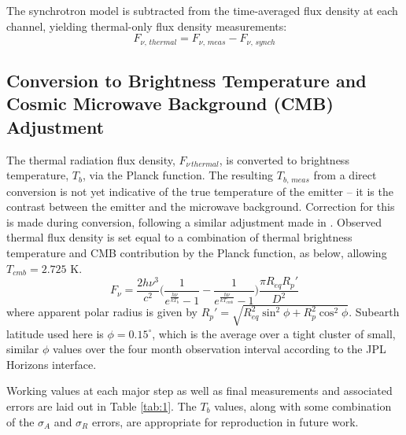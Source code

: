 \documentclass{article}
\newcommand{\expon}[1]{e^{#1}}
\begin{document}
	The synchrotron model is subtracted from the time-averaged flux density at each channel, yielding thermal-only flux density measurements:
	$$F_{\nu,\,thermal} = F_{\nu,\,meas} - F_{\nu,\,synch}$$


\subsection{Conversion to Brightness Temperature and Cosmic Microwave Background (CMB) Adjustment} %
	
	The thermal radiation flux density, $F_{\nu\,thermal}$, is converted to brightness temperature, $T_b$, via the Planck function.
	The resulting $T_{b,\,meas}$ from a direct conversion is not yet indicative of the true temperature of the emitter -- it is the contrast between the emitter and the microwave background.
	Correction for this is made during conversion, following a similar adjustment made in \citealt{2014Icar..237..211D}.
	Observed thermal flux density is set equal to a combination of thermal brightness temperature and CMB contribution by the Planck function, as below, allowing $T_{cmb} = 2.725$ K.
	$$ F_{\nu} = \frac{2h\nu^3}{c^2}\Bigg( \frac{1}{\expon{\frac{h\nu}{kT_b}} - 1} - \frac{1}{\expon{\frac{h\nu}{kT_{cmb}}} - 1} \Bigg)
		\frac{\pi R_{eq} R_{p}'}{D^2} $$
	where apparent polar radius is given by $R_{p}' = \sqrt{R_{eq}^{2}\sin^{2}{\phi} + R_{p}^{2}\cos^{2}{\phi}}$.
	Subearth latitude used here is $\phi = 0.15^{\circ}$, which is the average over a tight cluster of
	small, similar $\phi$ values over the four month observation interval according to the JPL Horizons interface.

	Working values at each major step as well as final measurements and associated errors are laid out in Table \ref{tab:1}.
	The $T_b$ values, along with some combination of the $\sigma_{A}$ and $\sigma_{R}$ errors, are appropriate for reproduction in future work.
\end{document}
